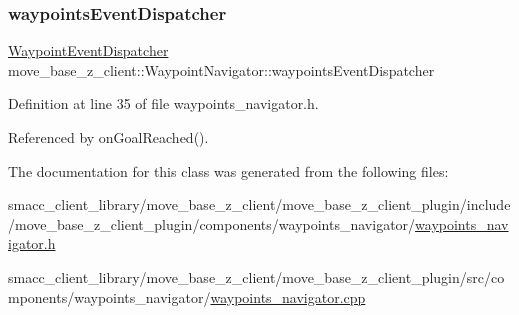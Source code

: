 \mbox{\label{classmove__base__z__client_1_1WaypointNavigator_a488a89db6cd20bc12548ac454254829f}} 
\subsubsection{\texorpdfstring{waypoints\+Event\+Dispatcher}{waypointsEventDispatcher}}
{\footnotesize\ttfamily \hyperlink{classmove__base__z__client_1_1WaypointEventDispatcher}{Waypoint\+Event\+Dispatcher} move\+\_\+base\+\_\+z\+\_\+client\+::\+Waypoint\+Navigator\+::waypoints\+Event\+Dispatcher}



Definition at line 35 of file waypoints\+\_\+navigator.\+h.



Referenced by on\+Goal\+Reached().



The documentation for this class was generated from the following files\+:\begin{DoxyCompactItemize}
\item 
smacc\+\_\+client\+\_\+library/move\+\_\+base\+\_\+z\+\_\+client/move\+\_\+base\+\_\+z\+\_\+client\+\_\+plugin/include/move\+\_\+base\+\_\+z\+\_\+client\+\_\+plugin/components/waypoints\+\_\+navigator/\hyperlink{waypoints__navigator_8h}{waypoints\+\_\+navigator.\+h}\item 
smacc\+\_\+client\+\_\+library/move\+\_\+base\+\_\+z\+\_\+client/move\+\_\+base\+\_\+z\+\_\+client\+\_\+plugin/src/components/waypoints\+\_\+navigator/\hyperlink{waypoints__navigator_8cpp}{waypoints\+\_\+navigator.\+cpp}\end{DoxyCompactItemize}
